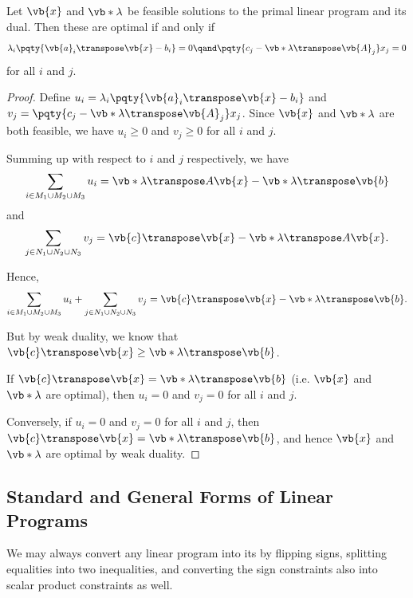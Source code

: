 \begin{theorem}
    \label{thm:optimality-condition-lp}%
    Let \(\vb{x}\) and \(\vb*{\lambda}\) be feasible solutions to the primal linear program and its dual. Then these are optimal if and only if
    \[
        \lambda_i \pqty{\vb{a}_i \transpose \vb{x} - b_i} = 0 \qand \pqty{c_j - \vb*{\lambda}\transpose \vb{A}_j} x_j = 0
    \]
    for all \(i\) and \(j\).
\end{theorem}

\begin{proof}
    Define \(u_i = \lambda_i \pqty{\vb{a}_i \transpose \vb{x} - b_i}\) and \(v_j = \pqty{c_j - \vb*{\lambda}\transpose \vb{A}_j} x_j\). Since \(\vb{x}\) and \(\vb*{\lambda}\) are both feasible, we have \(u_i \geq 0\) and \(v_j \geq 0\) for all \(i\) and \(j\).

    Summing up with respect to \(i\) and \(j\) respectively, we have
    \[
        \sum_{i \in M_1 \cup M_2 \cup M_3} u_i = \vb*{\lambda}\transpose A \vb{x} - \vb*{\lambda}\transpose \vb{b}
    \]
    and
    \[
        \sum_{j \in N_1 \cup N_2 \cup N_3} v_j = \vb{c}\transpose \vb{x} - \vb*{\lambda}\transpose A \vb{x}.
    \]

    Hence,
    \[
        \sum_{i \in M_1 \cup M_2 \cup M_3} u_i + \sum_{j \in N_1 \cup N_2 \cup N_3} v_j = \vb{c}\transpose \vb{x} - \vb*{\lambda}\transpose \vb{b}.
    \]

    But by weak duality, we know that \(\vb{c}\transpose \vb{x} \geq \vb*{\lambda}\transpose \vb{b}\).

    If \(\vb{c}\transpose \vb{x} = \vb*{\lambda}\transpose \vb{b}\) (i.e. \(\vb{x}\) and \(\vb*{\lambda}\) are optimal), then \(u_i = 0\) and \(v_j = 0\) for all \(i\) and \(j\).

    Conversely, if \(u_i = 0\) and \(v_j = 0\) for all \(i\) and \(j\), then \(\vb{c}\transpose \vb{x} = \vb*{\lambda}\transpose \vb{b}\), and hence \(\vb{x}\) and \(\vb*{\lambda}\) are optimal by weak duality.
\end{proof}

\subsection{Standard and General Forms of Linear Programs}

We may always convert any linear program into its  by flipping signs, splitting equalities into two inequalities, and converting the sign constraints also into scalar product constraints as well.

